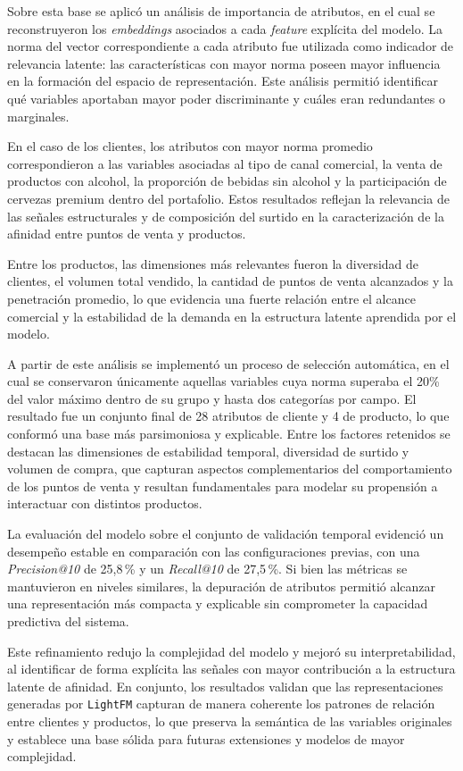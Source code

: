 Sobre esta base se aplicó un análisis de importancia de atributos, en el cual se reconstruyeron los \textit{embeddings} asociados a cada \textit{feature} explícita del modelo. La norma del vector correspondiente a cada atributo fue utilizada como indicador de relevancia latente: las características con mayor norma poseen mayor influencia en la formación del espacio de representación. Este análisis permitió identificar qué variables aportaban mayor poder discriminante y cuáles eran redundantes o marginales.

En el caso de los clientes, los atributos con mayor norma promedio correspondieron a las variables asociadas al tipo de canal comercial, la venta de productos con alcohol, la proporción de bebidas sin alcohol y la participación de cervezas premium dentro del portafolio. Estos resultados reflejan la relevancia de las señales estructurales y de composición del surtido en la caracterización de la afinidad entre puntos de venta y productos. 

Entre los productos, las dimensiones más relevantes fueron la diversidad de clientes, el volumen total vendido, la cantidad de puntos de venta alcanzados y la penetración promedio, lo que evidencia una fuerte relación entre el alcance comercial y la estabilidad de la demanda en la estructura latente aprendida por el modelo.

A partir de este análisis se implementó un proceso de selección automática, en el cual se conservaron únicamente aquellas variables cuya norma superaba el 20\% del valor máximo dentro de su grupo y hasta dos categorías por campo. El resultado fue un conjunto final de 28 atributos de cliente y 4 de producto, lo que conformó una base más parsimoniosa y explicable. Entre los factores retenidos se destacan las dimensiones de estabilidad temporal, diversidad de surtido y volumen de compra, que capturan aspectos complementarios del comportamiento de los puntos de venta y resultan fundamentales para modelar su propensión a interactuar con distintos productos.

La evaluación del modelo sobre el conjunto de validación temporal evidenció un desempeño estable en comparación con las configuraciones previas, con una \textit{Precision@10} de 25{,}8\,\% y un \textit{Recall@10} de 27{,}5\,\%. Si bien las métricas se mantuvieron en niveles similares, la depuración de atributos permitió alcanzar una representación más compacta y explicable sin comprometer la capacidad predictiva del sistema. 

Este refinamiento redujo la complejidad del modelo y mejoró su interpretabilidad, al identificar de forma explícita las señales con mayor contribución a la estructura latente de afinidad. En conjunto, los resultados validan que las representaciones generadas por \texttt{LightFM} capturan de manera coherente los patrones de relación entre clientes y productos, lo que preserva la semántica de las variables originales y establece una base sólida para futuras extensiones y modelos de mayor complejidad.

